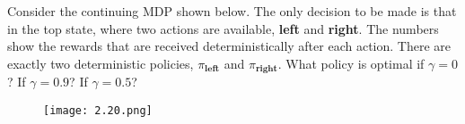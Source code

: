 \begin{exercise}
Consider the continuing MDP shown below.
The only decision to be made is that in the top state, where two actions are available, \textbf{left} and \textbf{right}.
The numbers show the rewards that are received deterministically after each action.
There are exactly two deterministic policies, $\pi_\textbf{left}$ and $\pi_\textbf{right}$.
What policy is optimal if $\gamma = 0$?
If $\gamma = 0.9$?
If $\gamma = 0.5$?

\begin{figure}[H]
    \centering
    \texttt{[image: 2.20.png]}
    \caption{}
    \label{fig:2.20}
\end{figure}

\end{exercise}

